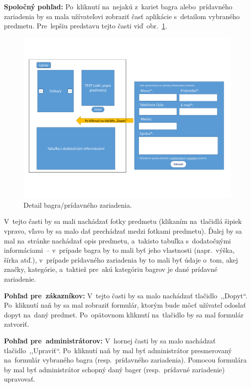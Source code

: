 \textbf{Spoločný pohľad:} Po~kliknutí na~nejakú z~kariet bagra alebo~prídavného zariadenia by sa mala užívateľovi zobraziť časť aplikácie s~detailom vybraného predmetu. Pre~lepšiu predstavu tejto časti viď~obr.~\ref{detail}.

\begin{figure}[H]\centering
\includegraphics[width=140mm]{../img/UI concept/detail}
\caption{Detail bagra/prídavného zariadenia.}
\label{detail}
\end{figure}

V~tejto časti by sa mali nachádzať fotky predmetu (klikaním na~tlačidlá šipiek vpravo, vľavo by sa malo dať prechádzať medzi fotkami predmetu). Ďalej by sa mal na~stránke nachádzať opis predmetu, a~takisto tabuľka s~dodatočnými informáciami~-- v~prípade bagra by to mali byť jeho vlastnosti (napr.~výška, šírka atď.), v~prípade prídavného zariadenia by to mali byť údaje o~tom, akej značky, kategórie, a~taktiež pre~akú kategóriu bagrov je dané prídavné zariadenie.

\textbf{Pohľad pre~zákazníkov:} V~tejto časti by sa malo nachádzať tlačidlo~,,Dopyt``. Po~kliknutí naň by sa mal zobraziť formulár, ktorým bude môcť užívateľ odoslať dopyt na~daný predmet. Po~opätovnom kliknutí na~tlačidlo by sa mal formulár zatvoriť.

\textbf{Pohľad pre~administrátorov:} V~hornej časti by sa malo nachádzať tlačidlo~,,Upraviť``. Po~kliknutí naň by mal byť administrátor presmerovaný na~formulár vybraného bagra (resp.~prídavného zariadenia). Pomocou formulára by mal byť administrátor schopný daný bager (resp.~prídavné zariadenie) upravovať.

